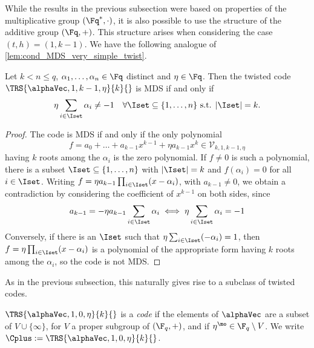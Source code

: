 \documentclass[conference,a4paper]{IEEEtran}
\begin{document}
\noindent
While the results in the previous subsection were based on properties of the multiplicative group $(\Fq^*,\cdot)$, it is also possible to use the structure of the additive group $(\Fq,+)$. This structure arises when considering the case $(t,h)=(1,k-1)$.
We have the following analogue of \cref{lem:cond_MDS_very_simple_twist}.
\begin{lemma}\label{lem:cond_MDS_primitively_twisted_h=k-1}
Let $k<n\leq q$, $\alpha_1,\dots,\alpha_n \in \Fq$ distinct and $\eta \in \Fq$. Then the twisted code $\TRS{\alphaVec,1,k-1,\eta}{k}{}$ is MDS if and only if
\begin{align}
\eta \sum_{i \in \Iset} \alpha_i \neq -1 \quad \forall \Iset \subseteq \{1,\dots,n\} \textrm{ s.t. } |\Iset|=k. \label{eq:cond_MDS_primitively_twisted_h=k-1}
\end{align}
\end{lemma}
\begin{proof}
  The code is MDS if and only if the only polynomial
  \[
    f = a_0 + \ldots + a_{k-1}x^{k-1} + \eta a_{k-1} x^k \in \mathcal{V}_{k,1,k-1,\eta}
  \]
  having $k$ roots among the $\alpha_i$ is the zero polynomial.
If $f \neq 0$ is such a polynomial, there is a subset $\Iset \subseteq \{1,\dots,n\}$ with $|\Iset|=k$ and $f(\alpha_i) = 0$ for all $i \in \Iset$.
Writing $f = \eta a_{k-1} \prod_{i \in \Iset}(x-\alpha_i)$, with $a_{k-1} \neq 0$, we obtain a contradiction by considering the coefficient of $x^{k-1}$ on both sides, since
\begin{align*}
  a_{k-1} = -\eta a_{k-1} \sum_{i \in \Iset} \alpha_i
  \iff
  \eta \sum_{i \in \Iset} \alpha_i = -1
\end{align*}
Conversely, if there is an $\Iset$ such that $\eta \sum_{i \in \Iset}(-\alpha_i) = 1$, then $f = \eta \prod_{i \in \Iset}(x-\alpha_i)$ is a polynomial of the appropriate form having $k$ roots among the $\alpha_i$, so the code is not MDS.
\end{proof}

As in the previous subsection, this naturally gives rise to a subclass of twisted codes.
\begin{definition}\label{def:plustwisted}
  $\TRS{\alphaVec,1,0,\eta}{k}{}$ is a \emph{\plustw code} if the elements of $\alphaVec$ are a subset of $V \cup \{\infty\}$, for $V$ a proper subgroup of $(\F_q, +)$, and if $\eta^\mo \in \F_q\setminus V$.
  We write $\Cplus := \TRS{\alphaVec,1,0,\eta}{k}{}$.
\end{definition}
\end{document}
